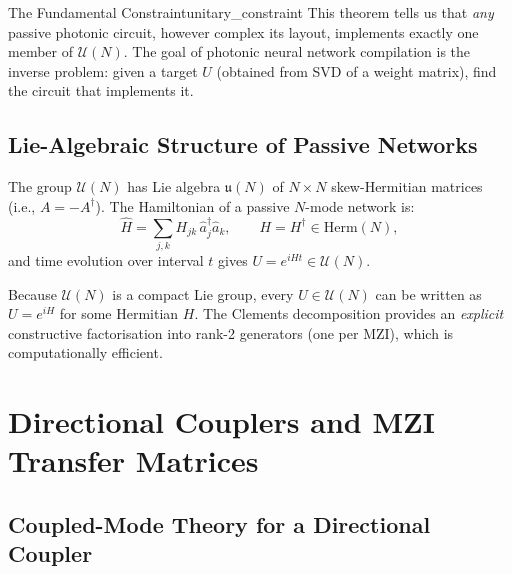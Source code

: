 \documentclass[12pt, a4paper]{article}
\newcommand{\calU}{\mathcal{U}}
\begin{document}
\begin{insight}{The Fundamental Constraint}{unitary_constraint}
  This theorem tells us that \emph{any} passive photonic circuit, however
  complex its layout, implements exactly one member of $\calU(N)$.
  The goal of photonic neural network compilation is the inverse problem:
  given a target $U$ (obtained from SVD of a weight matrix), find the
  circuit that implements it.
\end{insight}

\subsection{Lie-Algebraic Structure of Passive Networks}

The group $\calU(N)$ has Lie algebra $\mathfrak{u}(N)$ of $N\times N$
skew-Hermitian matrices (i.e., $A = -A^\dagger$).
The Hamiltonian of a passive $N$-mode network is:
\begin{equation}
  \hat{H} = \sum_{j,k} H_{jk}\,\hat{a}_j^\dagger\hat{a}_k,
  \qquad H = H^\dagger \in \mathrm{Herm}(N),
  \label{eq:passive_hamiltonian}
\end{equation}
and time evolution over interval $t$ gives $U = e^{iHt} \in \calU(N)$.

Because $\calU(N)$ is a compact Lie group, every $U\in\calU(N)$ can be
written as $U = e^{iH}$ for some Hermitian $H$.
The Clements decomposition provides an \emph{explicit} constructive factorisation
into rank-2 generators (one per MZI), which is computationally efficient.

\section{Directional Couplers and MZI Transfer Matrices}
\label{sec:mzi}

\subsection{Coupled-Mode Theory for a Directional Coupler}
\end{document}
